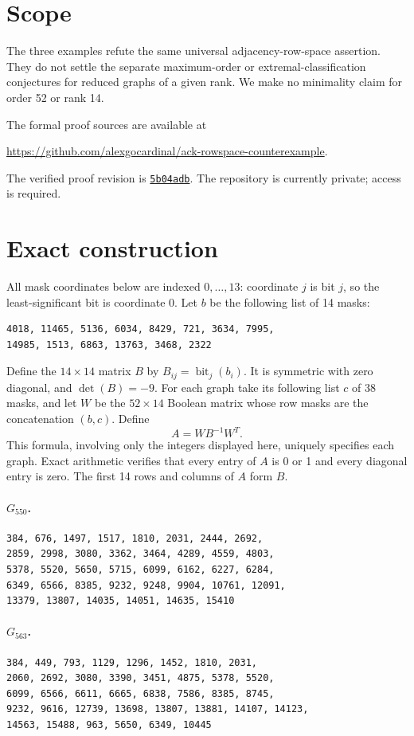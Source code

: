 \documentclass[11pt]{article}
\begin{document}
\section*{Scope}
The three examples refute the same universal adjacency-row-space
assertion. They do not settle the separate maximum-order or
extremal-classification conjectures for reduced graphs of a given
rank. We make no minimality claim for order 52 or rank 14.

The formal proof sources are available at
\begin{center}
\url{https://github.com/alexgocardinal/ack-rowspace-counterexample}.
\end{center}
The verified proof revision is
\href{https://github.com/alexgocardinal/ack-rowspace-counterexample/tree/5b04adb}
{\texttt{5b04adb}}.
The repository is currently private; access is required.
\newpage
\section*{Exact construction}
All mask coordinates below are indexed $0,\ldots,13$: coordinate $j$ is bit $j$, so the least-significant bit is coordinate 0. Let $b$ be the following list of 14 masks:
\begin{Verbatim}[fontsize=\small]
4018, 11465, 5136, 6034, 8429, 721, 3634, 7995,
14985, 1513, 6863, 13763, 3468, 2322
\end{Verbatim}
Define the $14\times14$ matrix $B$ by $B_{ij}=\operatorname{bit}_j(b_i)$.
It is symmetric with zero diagonal, and $\det(B)=-9$.
For each graph take its following list $c$ of 38 masks, and let $W$ be the $52\times14$ Boolean matrix whose row masks are the concatenation $(b,c)$. Define
\[
                         A=W B^{-1} W^T.
\]
This formula, involving only the integers displayed here, uniquely specifies each graph. Exact arithmetic verifies that every entry of $A$ is 0 or 1 and every diagonal entry is zero. The first 14 rows and columns of $A$ form $B$.
\paragraph{$G_{550}$.}
\begin{Verbatim}[fontsize=\small]
384, 676, 1497, 1517, 1810, 2031, 2444, 2692,
2859, 2998, 3080, 3362, 3464, 4289, 4559, 4803,
5378, 5520, 5650, 5715, 6099, 6162, 6227, 6284,
6349, 6566, 8385, 9232, 9248, 9904, 10761, 12091,
13379, 13807, 14035, 14051, 14635, 15410
\end{Verbatim}
\paragraph{$G_{563}$.}
\begin{Verbatim}[fontsize=\small]
384, 449, 793, 1129, 1296, 1452, 1810, 2031,
2060, 2692, 3080, 3390, 3451, 4875, 5378, 5520,
6099, 6566, 6611, 6665, 6838, 7586, 8385, 8745,
9232, 9616, 12739, 13698, 13807, 13881, 14107, 14123,
14563, 15488, 963, 5650, 6349, 10445
\end{Verbatim}
\end{document}
